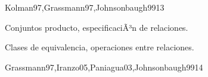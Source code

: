 \begin{syllabus}
\begin{outcomes}
\end{outcomes}

\begin{unit}{\DSONEDef}{Kolman97,Grassmann97,Johnsonbaugh99}{13}
\begin{topics}
	\item  \DSONETopicFunciones
	\item  Conjuntos producto, especificaciÃ³n de relaciones.
	\item  \DSONETopicRelaciones
	\item  Clases de equivalencia, operaciones entre relaciones.
	\item  \DSONETopicConjuntos
	\item  \DSONETopicPrincipio
	\item  \DSONETopicCardinalidad
\end{topics}

\begin{unitgoals}
	\item \DSONEObjONE
	\item \DSONEObjTWO
	\item \DSONEObjTHREE
	\item \DSONEObjFOUR
\end{unitgoals}
\end{unit}

\begin{unit}{\DSTWODef}{Grassmann97,Iranzo05,Paniagua03,Johnsonbaugh99}{14}
\begin{topics}
         \item \DSTWOTopicLogica
         \item \DSTWOTopicConectivos
         \item \DSTWOTopicTablas
         \item \DSTWOTopicFormas
         \item \DSTWOTopicValidacion
         \item \DSTWOTopicLogicade
     \item \DSTWOTopicCuantificacion
         \item \DSTWOTopicModus
         \item \DSTWOTopicLimitaciones
   \end{topics}

   \begin{unitgoals}
      \item \DSTWOObjONE
         \item \DSTWOObjTWO
         \item \DSTWOObjTHREE
         \item \DSTWOObjFOUR
   \end{unitgoals}
\end{unit}


\end{syllabus}
